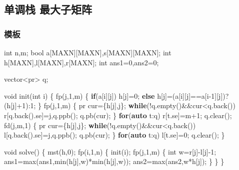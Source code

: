 \documentclass[
]{article}
\newenvironment{Shaded}{}{}
\newcommand{\ControlFlowTok}[1]{\textcolor[rgb]{0.00,0.44,0.13}{\textbf{#1}}}
\newcommand{\DataTypeTok}[1]{\textcolor[rgb]{0.56,0.13,0.00}{#1}}
\newcommand{\DecValTok}[1]{\textcolor[rgb]{0.25,0.63,0.44}{#1}}
\newcommand{\KeywordTok}[1]{\textcolor[rgb]{0.00,0.44,0.13}{\textbf{#1}}}
\newcommand{\NormalTok}[1]{#1}
\begin{document}
\hypertarget{ux5355ux8c03ux6808-ux6700ux5927ux5b50ux77e9ux9635}{%
\subsection{单调栈
最大子矩阵}\label{ux5355ux8c03ux6808-ux6700ux5927ux5b50ux77e9ux9635}}

\hypertarget{ux6a21ux677f-19}{%
\subsubsection{模板}\label{ux6a21ux677f-19}}

\begin{Shaded}
\begin{Highlighting}[]
\DataTypeTok{int}\NormalTok{ n,m;}
\DataTypeTok{bool}\NormalTok{ a[MAXN][MAXN],s[MAXN][MAXN];}
\DataTypeTok{int}\NormalTok{ h[MAXN],l[MAXN],r[MAXN];}
\DataTypeTok{int}\NormalTok{ ans1=}\DecValTok{0}\NormalTok{,ans2=}\DecValTok{0}\NormalTok{;}

\NormalTok{vector\textless{}pr\textgreater{} q;}

\DataTypeTok{void}\NormalTok{ init(}\DataTypeTok{int}\NormalTok{ i)}
\NormalTok{\{}
\NormalTok{    fp(j,}\DecValTok{1}\NormalTok{,m)}
\NormalTok{    \{}
        \ControlFlowTok{if}\NormalTok{(a[i][j]) h[j]=}\DecValTok{0}\NormalTok{;}
        \ControlFlowTok{else}\NormalTok{ h[j]=(a[i][j]==a[i{-}}\DecValTok{1}\NormalTok{][j])?(h[j]+}\DecValTok{1}\NormalTok{):}\DecValTok{1}\NormalTok{;}
\NormalTok{    \}}
\NormalTok{    fp(j,}\DecValTok{1}\NormalTok{,m)}
\NormalTok{    \{}
\NormalTok{        pr cur=\{h[j],j\};}
        \ControlFlowTok{while}\NormalTok{(!q.empty()\&\&cur\textless{}q.back())}
\NormalTok{            r[q.back().se]=j,q.ppb();}
\NormalTok{        q.pb(cur);}
\NormalTok{    \}}
    \ControlFlowTok{for}\NormalTok{(}\KeywordTok{auto}\NormalTok{ t:q) r[t.se]=m+}\DecValTok{1}\NormalTok{;}
\NormalTok{    q.clear();}
\NormalTok{    fd(j,m,}\DecValTok{1}\NormalTok{)}
\NormalTok{    \{}
\NormalTok{        pr cur=\{h[j],j\};}
        \ControlFlowTok{while}\NormalTok{(!q.empty()\&\&cur\textless{}q.back())}
\NormalTok{            l[q.back().se]=j,q.ppb();}
\NormalTok{        q.pb(cur);}
\NormalTok{    \}}
    \ControlFlowTok{for}\NormalTok{(}\KeywordTok{auto}\NormalTok{ t:q) l[t.se]=}\DecValTok{0}\NormalTok{;}
\NormalTok{    q.clear();}
\NormalTok{\}}

\DataTypeTok{void}\NormalTok{ solve()}
\NormalTok{\{}
\NormalTok{    mst(h,}\DecValTok{0}\NormalTok{);}
\NormalTok{    fp(i,}\DecValTok{1}\NormalTok{,n)}
\NormalTok{    \{}
\NormalTok{        init(i);}
\NormalTok{        fp(j,}\DecValTok{1}\NormalTok{,m)}
\NormalTok{        \{}
            \DataTypeTok{int}\NormalTok{ w=r[j]{-}l[j]{-}}\DecValTok{1}\NormalTok{;}
\NormalTok{            ans1=max(ans1,min(h[j],w)*min(h[j],w));}
\NormalTok{            ans2=max(ans2,w*h[j]);}
\NormalTok{        \}}
\NormalTok{    \}}
\NormalTok{\}}
\end{Highlighting}
\end{Shaded}
\end{document}
